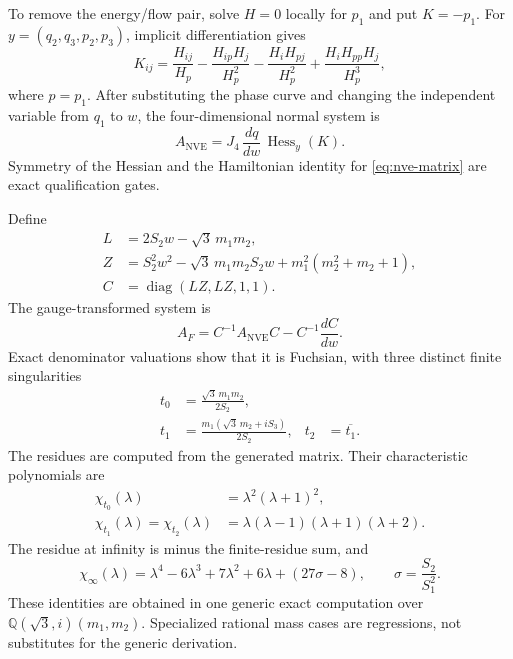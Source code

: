 \documentclass[11pt]{article}
\theoremstyle{definition}
\theoremstyle{remark}
\begin{document}
To remove the energy/flow pair, solve \(H=0\) locally for \(p_1\) and put
\(K=-p_1\).  For \(y=(q_2,q_3,p_2,p_3)\), implicit differentiation gives
\begin{equation}
 K_{ij}=\frac{H_{ij}}{H_p}
 -\frac{H_{ip}H_j}{H_p^2}
 -\frac{H_iH_{pj}}{H_p^2}
 +\frac{H_iH_{pp}H_j}{H_p^3},
\label{eq:whittaker-hessian}
\end{equation}
where \(p=p_1\).  After substituting the phase curve and changing the
independent variable from \(q_1\) to \(w\), the four-dimensional normal
system is
\begin{equation}
 A_{\mathrm{NVE}}
   =J_4\,\frac{dq}{dw}\,\operatorname{Hess}_y(K).
\label{eq:nve-matrix}
\end{equation}
Symmetry of the Hessian and the Hamiltonian identity for
\eqref{eq:nve-matrix} are exact qualification gates.

Define
\begin{align}
 L&=2S_2w-\sqrt3\,m_1m_2,\nonumber\\
 Z&=S_2^2w^2-\sqrt3\,m_1m_2S_2w
      +m_1^2(m_2^2+m_2+1),\nonumber\\
 C&=\operatorname{diag}(LZ,LZ,1,1).
\label{eq:gauge}
\end{align}
The gauge-transformed system is
\[
 A_F=C^{-1}A_{\mathrm{NVE}}C-C^{-1}\frac{dC}{dw}.
\]
Exact denominator valuations show that it is Fuchsian, with three distinct
finite singularities
\begin{align}
t_0&=\frac{\sqrt3\,m_1m_2}{2S_2},\nonumber\\
t_1&=\frac{m_1(\sqrt3\,m_2+iS_3)}{2S_2},&
t_2&=\overline{t_1}.
\label{eq:singularities}
\end{align}
The residues are computed from the generated matrix.  Their characteristic
polynomials are
\begin{align}
\chi_{t_0}(\lambda)&=\lambda^2(\lambda+1)^2,\nonumber\\
\chi_{t_1}(\lambda)
  =\chi_{t_2}(\lambda)
  &=\lambda(\lambda-1)(\lambda+1)(\lambda+2).
\label{eq:finite-charpoly}
\end{align}
The residue at infinity is minus the finite-residue sum, and
\begin{equation}
\chi_\infty(\lambda)
 =\lambda^4-6\lambda^3+7\lambda^2+6\lambda+(27\sigma-8),
\qquad
\sigma=\frac{S_2}{S_1^2}.
\label{eq:infinity-charpoly}
\end{equation}
These identities are obtained in one generic exact computation over
\(\mathbb{Q}(\sqrt3,i)(m_1,m_2)\).  Specialized rational mass cases are
regressions, not substitutes for the generic derivation.
\end{document}
